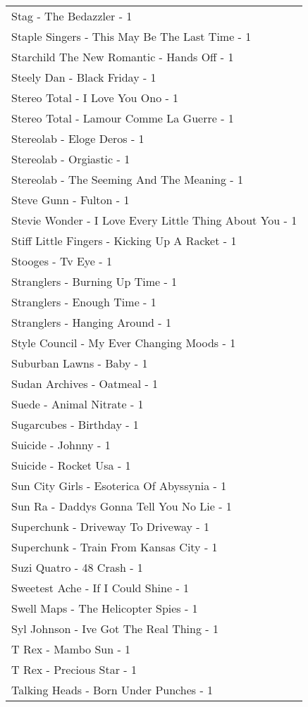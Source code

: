 \documentclass[
]{article}
\begin{document}
\begin{longtable}{l}
Stag - The Bedazzler - 1 \\ 
Staple Singers - This May Be The Last Time - 1 \\ 
Starchild The New Romantic - Hands Off - 1 \\ 
Steely Dan - Black Friday - 1 \\ 
Stereo Total - I Love You Ono - 1 \\ 
Stereo Total - Lamour Comme La Guerre - 1 \\ 
Stereolab - Eloge Deros - 1 \\ 
Stereolab - Orgiastic - 1 \\ 
Stereolab - The Seeming And The Meaning - 1 \\ 
Steve Gunn - Fulton - 1 \\ 
Stevie Wonder - I Love Every Little Thing About You - 1 \\ 
Stiff Little Fingers - Kicking Up A Racket - 1 \\ 
Stooges - Tv Eye - 1 \\ 
Stranglers - Burning Up Time - 1 \\ 
Stranglers - Enough Time - 1 \\ 
Stranglers - Hanging Around - 1 \\ 
Style Council - My Ever Changing Moods - 1 \\ 
Suburban Lawns - Baby - 1 \\ 
Sudan Archives - Oatmeal - 1 \\ 
Suede - Animal Nitrate - 1 \\ 
Sugarcubes - Birthday - 1 \\ 
Suicide - Johnny - 1 \\ 
Suicide - Rocket Usa - 1 \\ 
Sun City Girls - Esoterica Of Abyssynia - 1 \\ 
Sun Ra - Daddys Gonna Tell You No Lie - 1 \\ 
Superchunk - Driveway To Driveway - 1 \\ 
Superchunk - Train From Kansas City - 1 \\ 
Suzi Quatro - 48 Crash - 1 \\ 
Sweetest Ache - If I Could Shine - 1 \\ 
Swell Maps - The Helicopter Spies - 1 \\ 
Syl Johnson - Ive Got The Real Thing - 1 \\ 
T Rex - Mambo Sun - 1 \\ 
T Rex - Precious Star - 1 \\ 
Talking Heads - Born Under Punches - 1 \\ 

\end{longtable}
\end{document}
